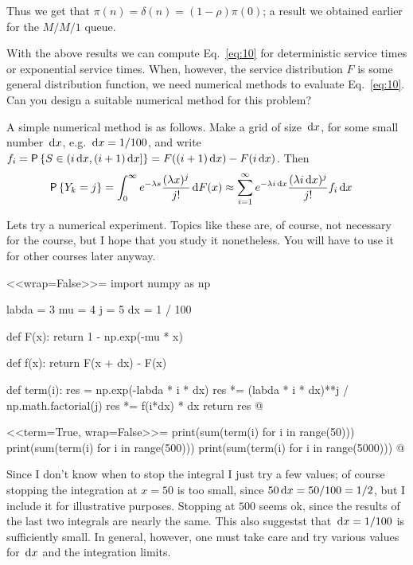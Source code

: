 \begin{question}
\begin{solution}
Thus we get that $\pi(n) = \delta(n) = (1-\rho) \pi(0)$; a result we
obtained earlier for the $M/M/1$ queue.
\end{solution}
\end{question}


\begin{question}
 With the above results we can compute
  Eq.~\eqref{eq:10} for deterministic service times or exponential
  service times. When, however, the service distribution $F$ is some
  general distribution function, we need numerical methods to evaluate
  Eq.~\eqref{eq:10}. Can you design a suitable numerical method for
  this problem?
  \begin{solution}
  A simple numerical method is as follows. Make a grid of
  size $\,\text{d}x$, for some small number $\,\text{d}x$, e.g. $\,\text{d}x=1/100$, and write
  $f_i = \P{S\in(i\d x, (i+1)\d x]} = F((i+1)\d x) - F(i\d x)$. Then 
  \begin{equation*}
    \begin{split}
  \P{Y_k = j} 
&= \int_0^\infty e^{-\lambda s}\frac{(\lambda x)^j}{j!} \d F(x) 
\approx \sum_{i=1}^\infty e^{-\lambda i \d x}\frac{(\lambda i\d x)^j}{j!} f_i \d x
    \end{split}
\end{equation*}

Lets try a numerical experiment. Topics like these are, of course, not
necessary for the course, but I hope that you study it nonetheless.
You will have to use it for other courses later anyway.

<<wrap=False>>=
import numpy as np

labda = 3
mu = 4
j = 5
dx = 1 / 100


def F(x):
    return 1 - np.exp(-mu * x)


def f(x):
    return F(x + dx) - F(x)


def term(i):
    res = np.exp(-labda * i * dx)
    res *= (labda * i * dx)**j / np.math.factorial(j)
    res *= f(i*dx) * dx
    return res
@

<<term=True, wrap=False>>=
print(sum(term(i) for i in range(50)))
print(sum(term(i) for i in range(500)))
print(sum(term(i) for i in range(5000)))
@

Since I don't know when to stop the integral I just try a few values;
of course stopping the integration at $x=50$ is too small, since
$50\,\text{d}x=50/100=1/2$, but I include it for illustrative
purposes. Stopping at $500$ seems ok, since the results of the last
two integrals are nearly the same. This also suggestst that
$\,\text{d}x=1/100$ is sufficiently small. In general, however, one must take
care and try various values for $\,\text{d}x$ and the integration limits.



\end{solution}
\end{question}
